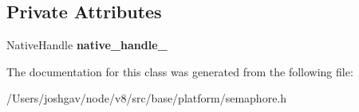 \subsection*{Private Attributes}
\begin{DoxyCompactItemize}
\item 
Native\+Handle {\bfseries native\+\_\+handle\+\_\+}\hypertarget{classv8_1_1base_1_1_semaphore_aa2e6ab037a5a5e3d16e0bb95f1a55de4}{}\label{classv8_1_1base_1_1_semaphore_aa2e6ab037a5a5e3d16e0bb95f1a55de4}

\end{DoxyCompactItemize}


The documentation for this class was generated from the following file\+:\begin{DoxyCompactItemize}
\item 
/\+Users/joshgav/node/v8/src/base/platform/semaphore.\+h\end{DoxyCompactItemize}
